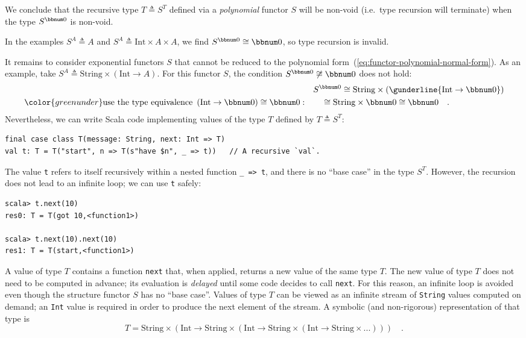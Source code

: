 We conclude that the recursive type $T\triangleq S^{T}$ defined via
a \emph{polynomial} functor $S$ will be non-void (i.e.~type recursion
will terminate) when the type $S^{\bbnum 0}$ is non-void.

In the examples $S^{A}\triangleq A$ and $S^{A}\triangleq\text{Int}\times A\times A$,
we find $S^{\bbnum 0}\cong\bbnum 0$, so type recursion is invalid.

It remains to consider exponential functors $S$ that cannot be reduced
to the polynomial form~(\ref{eq:functor-polynomial-normal-form}).
As an example, take $S^{A}\triangleq\text{String}\times(\text{Int}\rightarrow A)$.
For this functor $S$, the condition $S^{\bbnum 0}\not\cong\bbnum 0$
does not hold:
\begin{align*}
 & S^{\bbnum 0}\cong\text{String}\times(\gunderline{\text{Int}\rightarrow\bbnum 0})\\
{\color{greenunder}\text{use the type equivalence }\left(\text{Int}\rightarrow\bbnum 0\right)\cong\bbnum 0:}\quad & \quad\cong\text{String}\times\bbnum 0\cong\bbnum 0\quad.
\end{align*}
Nevertheless, we can write Scala code implementing values of the type
$T$ defined by $T\triangleq S^{T}$:
\begin{lstlisting}
final case class T(message: String, next: Int => T)
val t: T = T("start", n => T(s"have $n", _ => t))   // A recursive `val`.
\end{lstlisting}
The value \lstinline!t! refers to itself recursively within a nested
function \lstinline!_ => t!, and there is no ``base case'' in the
type $S^{T}$. However, the recursion does not lead to an infinite
loop; we can use \lstinline!t! safely:
\begin{lstlisting}
scala> t.next(10)
res0: T = T(got 10,<function1>)

scala> t.next(10).next(10)
res1: T = T(start,<function1>)
\end{lstlisting}
A value of type $T$ contains a function \lstinline!next! that, when
applied, returns a new value of the same type $T$. The new value
of type $T$ does not need to be computed in advance; its evaluation
is \emph{delayed} until some code decides to call \lstinline!next!.
For this reason, an infinite loop is avoided even though the structure
functor $S$ has no ``base case''. Values of type $T$ can be viewed
as an infinite stream of \lstinline!String! values computed on demand;
an \lstinline!Int! value is required in order to produce the next
element of the stream. A symbolic (and non-rigorous) representation
of that type is
\[
T=\text{String}\times(\text{Int}\rightarrow\text{String}\times(\text{Int}\rightarrow\text{String}\times(\text{Int}\rightarrow\text{String}\times...)))\quad.
\]


